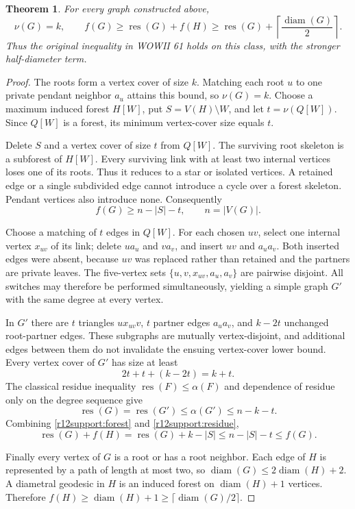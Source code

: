 \documentclass[11pt,a4paper]{article}
\newtheorem{theorem}{Theorem}[section]
\theoremstyle{definition}\newtheorem{definition}[theorem]{Definition}
\theoremstyle{remark}\newtheorem{remark}[theorem]{Remark}
\newcommand{\res}{\operatorname{res}}
\newcommand{\diam}{\operatorname{diam}}
\begin{document}
\begin{theorem}
\label{r12support:main}
For every graph constructed above,
\[
 \nu(G)=k,\qquad
 f(G)\ge\res(G)+f(H)
       \ge\res(G)+\left\lceil\frac{\diam(G)}2\right\rceil.
\]
Thus the original inequality in WOWII 61 holds on this class, with the
stronger half-diameter term.
\end{theorem}
\begin{proof}
The roots form a vertex cover of size $k$. Matching each root $u$ to
one private pendant neighbor $a_u$ attains this bound, so $\nu(G)=k$.
Choose a maximum induced forest $H[W]$, put $S=V(H)\setminus W$, and
let $t=\nu(Q[W])$. Since $Q[W]$ is a forest, its minimum vertex-cover
size equals $t$.

Delete $S$ and a vertex cover of size $t$ from $Q[W]$. The surviving
root skeleton is a subforest of $H[W]$. Every surviving link with at
least two internal vertices loses one of its roots. Thus it reduces
to a star or isolated vertices. A retained edge or a single subdivided
edge cannot introduce a cycle over a forest skeleton. Pendant vertices
also introduce none. Consequently
\begin{equation}
 f(G)\ge n-|S|-t,\qquad n=|V(G)|.
 \label{r12support:forest}
\end{equation}

Choose a matching of $t$ edges in $Q[W]$. For each chosen $uv$, select
one internal vertex $x_{uv}$ of its link; delete $ua_u$ and $va_v$,
and insert $uv$ and $a_ua_v$. Both inserted edges were absent, because
$uv$ was replaced rather than retained and the partners are private
leaves. The five-vertex sets $\{u,v,x_{uv},a_u,a_v\}$ are pairwise
disjoint. All switches may therefore be performed simultaneously,
yielding a simple graph $G'$ with the same degree at every vertex.

In $G'$ there are $t$ triangles $ux_{uv}v$, $t$ partner edges
$a_ua_v$, and $k-2t$ unchanged root-partner edges. These subgraphs are
mutually vertex-disjoint, and additional edges between them do not
invalidate the ensuing vertex-cover lower bound. Every vertex cover
of $G'$ has size at least
\[
 2t+t+(k-2t)=k+t.
\]
The classical residue inequality $\res(F)\le\alpha(F)$ and dependence
of residue only on the degree sequence give
\begin{equation}
 \res(G)=\res(G')\le\alpha(G')\le n-k-t.
 \label{r12support:residue}
\end{equation}
Combining \eqref{r12support:forest} and \eqref{r12support:residue},
\[
 \res(G)+f(H)=\res(G)+k-|S|
       \le n-|S|-t\le f(G).
\]

Finally every vertex of $G$ is a root or has a root neighbor. Each
edge of $H$ is represented by a path of length at most two, so
$\diam(G)\le2\diam(H)+2$. A diametral geodesic in $H$ is an induced
forest on $\diam(H)+1$ vertices. Therefore
$f(H)\ge\diam(H)+1\ge\lceil\diam(G)/2\rceil$.
\end{proof}
\end{document}
